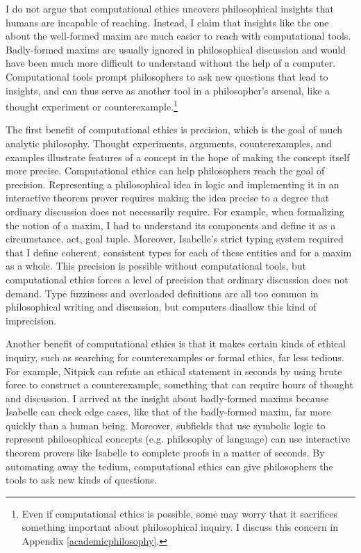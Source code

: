 \begin{isabellebody}
\begin{isamarkuptext}
I do not argue that computational ethics uncovers philosophical insights that humans are incapable 
of reaching. Instead, I claim that insights like the one about the well-formed maxim are much easier
to reach with computational tools. Badly-formed maxims are usually ignored in philosophical discussion 
and would have been much more difficult to understand without the help of a computer. Computational 
tools prompt philosophers to ask new questions that 
lead to insights, and can thus serve as another tool in a philosopher's arsenal, like a 
thought experiment or counterexample.\footnote{Even if computational ethics is possible, some may 
worry that it sacrifices something important about philosophical inquiry. I discuss this concern in Appendix 
\ref{academicphilosophy}.}

The first benefit of computational ethics is precision, which is the goal of much analytic
philosophy. Thought experiments, arguments, counterexamples, and examples 
illustrate features of a concept in the hope of making the concept itself more precise. Computational 
ethics can help philosophers reach the goal of precision. Representing a philosophical idea in logic 
and implementing it in an interactive theorem prover requires making the idea precise to a degree 
that ordinary discussion does not necessarily require. For example, when formalizing the notion of a 
maxim, I had to understand its components and define it as a circumstance, act, goal tuple. Moreover, 
Isabelle's strict typing system required that I define coherent, consistent types for each of these 
entities and for a maxim as a whole. This precision is possible without computational tools, but 
computational ethics forces a level of precision that ordinary discussion does not demand. Type 
fuzziness and overloaded definitions are all too common in philosophical writing and 
discussion, but computers diaallow this kind of imprecision.

Another benefit of computational ethics is that it makes certain kinds of ethical inquiry, such as 
searching for counterexamples or formal ethics, far less tedious. For example, Nitpick can refute 
an ethical statement in seconds by using brute force to construct a counterexample, something that can require hours
of thought and discussion. I arrived at the insight about badly-formed maxims because Isabelle 
can check edge cases, like that of the badly-formed maxim, far more quickly than a human being. Moreover, 
subfields that use symbolic logic to represent philosophical concepts (e.g. philosophy of language) can 
use interactive theorem provers like Isabelle to complete proofs in a matter of seconds. By automating 
away the tedium, computational ethics can give philosophers the tools to ask new kinds of questions.


\end{isamarkuptext}
\end{isabellebody}
